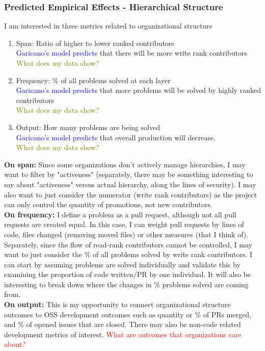 \documentclass[source/paper/main.tex]{subfiles}
\begin{document}
\subsubsection{Predicted Empirical Effects - Hierarchical Structure}
I am interested in three metrics related to organizational structure
\begin{enumerate}
    \item Span: Ratio of higher to lower ranked contributors \\
    \textcolor{blue}{Garicano's model predicts} that there will be more write rank contributors\\
    \textcolor{olive}{What does my data show?}
    \item Frequency: \% of all problems solved at each layer\\
    \textcolor{blue}{Garicano's model predicts} that more problems will be solved by highly ranked contributors \\
    \textcolor{olive}{What does my data show?}
    \item Output: How many problems are being solved\\
    \textcolor{blue}{Garicano's model predicts} that overall production will decrease. \\
    \textcolor{olive}{What does my data show?}
\end{enumerate}
\textbf{On span:} Since some organizations don't actively manage hierarchies, I may want to filter by "activeness" (separately, there may be something interesting to say about "activeness" versus actual hierarchy, along the lines of security). I may also want to just consider the numerator (write rank contributors) as the project can only control the quantity of promotions, not new contributors. \\
\textbf{On frequency: } I define a problem as a pull request, although not all pull requests are created equal. In this case, I can weight pull requests by lines of code, files changed (removing moved files) or other measures (that I think of). Separately, since the flow of read-rank contributors cannot be controlled, I may want to just consider the \% of all problems solved by write rank contributors. I can start by assuming problems are solved individually and validate this by examining the proportion of code written/PR by one individual. It will also be interesting to break down where the changes in \% problems solved are coming from. \\
\textbf{On output: } This is my opportunity to connect organizational structure outcomes to OSS development outcomes such as quantity or \% of PRs merged, and \% of opened issues that are closed. There may also be non-code related development metrics of interest. 
\textcolor{red}{What are outcomes that organizations care about?}
\end{document}
